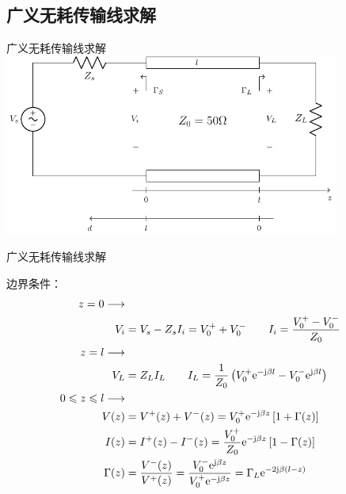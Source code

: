 \subsection{广义无耗传输线求解}


\begin{frame}{广义无耗传输线求解}
  \centering
  \includegraphics[width=11cm]{Cha3//fig3-16.pdf}
\end{frame}


\begin{frame}{广义无耗传输线求解}

  \flushleft
  边界条件：
  \begin{align}
    z=0\longrightarrow   \notag                                                                                      \\
    V_i & =V_s-Z_sI_i=V_0^++V_0^- \qquad   I_i =\frac{V_0^+-V_0^-}{Z_0} \notag                                                                          \\
    z=l\longrightarrow              \notag                                                                           \\
    V_L & =Z_LI_L    \qquad      I_L =\frac{1}{Z_0}\left( V_0^+\mathrm{e}^{-\mathrm{j}\beta l}-V_0^-\mathrm{e}^{\mathrm{j}\beta l}\right) \notag\\
    0\leqslant z \leqslant l \longrightarrow  \notag                                                                                                                         \\
    V(z)      & = V^+(z)+V^-(z) = V_0^+\mathrm{e}^{-\mathrm{j}\beta z}\left[ 1+\Gamma(z)\right]\label{eqn1}                                                                             \\
    I(z)      & = I^+(z)-I^-(z) = \frac{V_0^+}{Z_0}\mathrm{e}^{-\mathrm{j}\beta z}\left[1-\Gamma(z)\right]\label{eqn2}                                                                   \\
    \Gamma(z) & =\dfrac{V^-(z)}{V^+(z)}=\dfrac{V_0^-\mathrm{e}^{\mathrm{j}\beta z}}{V_0^+\mathrm{e}^{-\mathrm{j}\beta z}}=\Gamma_L\mathrm{e}^{-2\mathrm{j}\beta(l-z)} \notag
  \end{align}

\end{frame}

